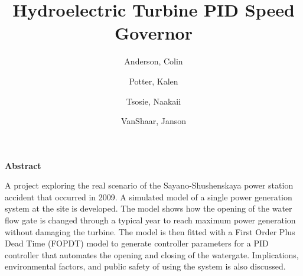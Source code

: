 \documentclass{article}
\title{Hydroelectric Turbine PID Speed Governor}
\author{
    Anderson, Colin
    \and
    Potter, Kalen
    \and
    Tsosie, Naakaii
    \and
    VanShaar, Janson
}
\date{}
\begin{document}
    \maketitle

    \thispagestyle{plain}
    
    \noindent\makebox[\linewidth]{\rule{\textwidth}{0.4pt}}

    \begin{center}
        \textbf{Abstract}
    \end{center}


    A project exploring the real scenario of the Sayano-Shushenskaya power station 
    accident that occurred in 2009.  A simulated model of a single power generation 
    system at the site is developed.  The model shows how the opening of the water flow 
    gate is changed through a typical year to reach maximum power generation without 
    damaging the turbine.  The model is then fitted with a First Order Plus Dead Time 
    (FOPDT) model to generate controller parameters for a PID controller that automates 
    the opening and closing of the watergate.  Implications, environmental factors, 
    and public safety of using the system is also discussed.

    \noindent\makebox[\linewidth]{\rule{\textwidth}{0.4pt}}
\end{document}
